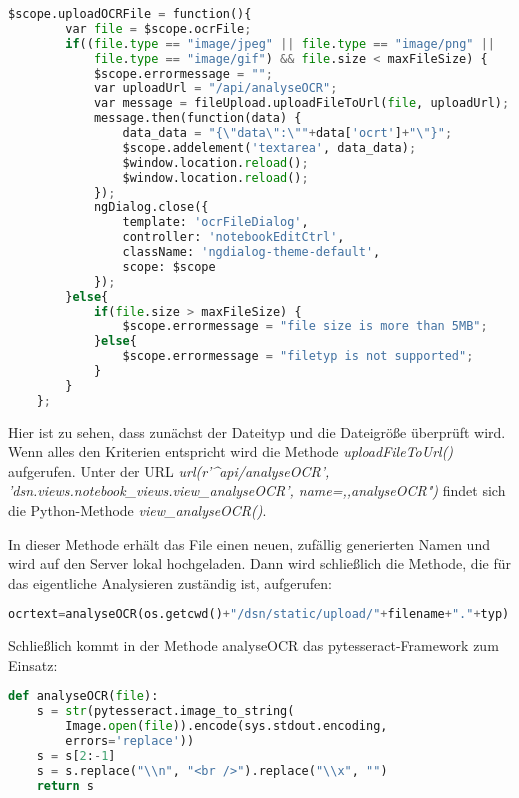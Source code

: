 \begin{lstlisting}[caption={Upload OCR-File}, language=Python]
$scope.uploadOCRFile = function(){
        var file = $scope.ocrFile;
        if((file.type == "image/jpeg" || file.type == "image/png" ||
        	file.type == "image/gif") && file.size < maxFileSize) {
            $scope.errormessage = "";
            var uploadUrl = "/api/analyseOCR";
            var message = fileUpload.uploadFileToUrl(file, uploadUrl);
            message.then(function(data) {
                data_data = "{\"data\":\""+data['ocrt']+"\"}";
                $scope.addelement('textarea', data_data);
                $window.location.reload();
                $window.location.reload();
            });
            ngDialog.close({
                template: 'ocrFileDialog',
                controller: 'notebookEditCtrl',
                className: 'ngdialog-theme-default',
                scope: $scope
            });
        }else{
            if(file.size > maxFileSize) {
                $scope.errormessage = "file size is more than 5MB";
            }else{
                $scope.errormessage = "filetyp is not supported";
            }
        }
    };
\end{lstlisting}

Hier ist zu sehen, dass zunächst der Dateityp und die Dateigröße überprüft wird. Wenn alles den Kriterien entspricht wird die Methode \textit{uploadFileToUrl()} aufgerufen. Unter der URL \textit{url(r'\^{}api/analyseOCR', 'dsn.views.notebook\_views.view\_analyseOCR', name=,,analyseOCR")} findet sich die Python-Methode \textit{view\_analyseOCR()}.

\newpage

In dieser Methode erhält das File einen neuen, zufällig generierten Namen und wird auf den Server lokal hochgeladen. Dann wird schließlich die Methode, die für das eigentliche Analysieren zuständig ist, aufgerufen:

\begin{lstlisting}[caption={OCR-Analyse}, language=Python]
ocrtext=analyseOCR(os.getcwd()+"/dsn/static/upload/"+filename+"."+typ)
\end{lstlisting}

Schließlich kommt in der Methode analyseOCR das pytesseract-Framework zum Einsatz:

\begin{lstlisting}[caption={analyseOCR mittels pytesseract}, language=Python]
def analyseOCR(file):
	s = str(pytesseract.image_to_string(
		Image.open(file)).encode(sys.stdout.encoding,
		errors='replace'))
    s = s[2:-1]
    s = s.replace("\\n", "<br />").replace("\\x", "")
    return s
\end{lstlisting}

